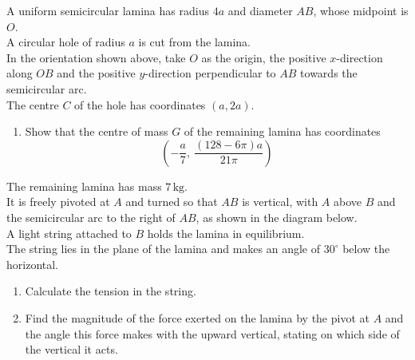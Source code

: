 \documentclass[leqno]{article}
\begin{document}
\begin{enumerate}[
  label=\textbf{\arabic*.},
  leftmargin=*,
  topsep=0pt,
  partopsep=0pt,
  parsep=0pt
]
A uniform semicircular lamina has radius $4a$ and diameter $AB$, whose midpoint is $O$. \\
A circular hole of radius $a$ is cut from the lamina. \\
In the orientation shown above, take $O$ as the origin, the positive $x$-direction along $OB$ and the positive $y$-direction perpendicular to $AB$ towards the semicircular arc. \\
The centre $C$ of the hole has coordinates $(a,2a)$. \\
\begin{enumerate}[label=\textbf{(\alph*)}]
\item Show that the centre of mass $G$ of the remaining lamina has coordinates
\[
\left(-\dfrac{a}{7},\ \dfrac{(128-6\pi)a}{21\pi}\right)
\] 
\end{enumerate}
The remaining lamina has mass $7\,\mathrm{kg}$. \\
It is freely pivoted at $A$ and turned so that $AB$ is vertical, with $A$ above $B$ and the semicircular arc to the right of $AB$, as shown in the diagram below. \\
A light string attached to $B$ holds the lamina in equilibrium. \\
The string lies in the plane of the lamina and makes an angle of $30^\circ$ below the horizontal. \\
\begin{figure}[H]
    \centering
{}
\end{figure}


\begin{enumerate}[label=\textbf{(\alph*)}, resume]
\item Calculate the tension in the string.  \\
\item Find the magnitude of the force exerted on the lamina by the pivot at $A$ and the angle this force makes with the upward vertical, stating on which side of the vertical it acts.  \\
\end{enumerate}


\end{enumerate}
\end{document}

